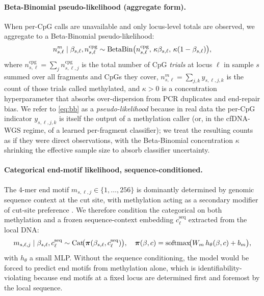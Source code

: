 \paragraph{Beta-Binomial pseudo-likelihood (aggregate form).} When per-CpG calls are unavailable and only locus-level totals are observed, we aggregate to a Beta-Binomial pseudo-likelihood:
\begin{equation}
n^m_{s,\ell}\mid \beta_{s,\ell}, n^{\mathrm{cpg}}_{s,\ell} \sim \mathrm{BetaBin}\big(n^{\mathrm{cpg}}_{s,\ell},\, \kappa\beta_{s,\ell},\,\kappa(1-\beta_{s,\ell})\big),
\label{eq:bb}
\end{equation}
where $n^{\mathrm{cpg}}_{s,\ell}=\sum_j n^{\mathrm{cpg}}_{s,\ell,j}$ is the total number of CpG \emph{trials} at locus $\ell$ in sample $s$ summed over all fragments and CpGs they cover, $n^m_{s,\ell}=\sum_{j,k}y_{s,\ell,j,k}$ is the count of those trials called methylated, and $\kappa>0$ is a concentration hyperparameter that absorbs over-dispersion from PCR duplicates and end-repair bias. We refer to \eqref{eq:bb} as a \emph{pseudo-likelihood} because in real data the per-CpG indicator $y_{s,\ell,j,k}$ is itself the output of a methylation caller (or, in the cfDNA-WGS regime, of a learned per-fragment classifier); we treat the resulting counts as if they were direct observations, with the Beta-Binomial concentration $\kappa$ shrinking the effective sample size to absorb classifier uncertainty.

\paragraph{Categorical end-motif likelihood, sequence-conditioned.} The 4-mer end motif $m_{s,\ell,j}\in\{1,\dots,256\}$ is dominantly determined by genomic sequence context at the cut site, with methylation acting as a secondary modifier of cut-site preference \citep{zhou2022}. We therefore condition the categorical on both methylation and a frozen sequence-context embedding $c^{\mathrm{seq}}_\ell$ extracted from the local DNA:
\begin{equation}
m_{s,\ell,j}\mid \beta_{s,\ell}, c^{\mathrm{seq}}_\ell \sim \mathrm{Cat}\!\big(\boldsymbol{\pi}(\beta_{s,\ell}, c^{\mathrm{seq}}_\ell)\big),\quad
\boldsymbol{\pi}(\beta, c) = \mathrm{softmax}\!\big(W_m\,h_\theta(\beta, c) + b_m\big),
\end{equation}
with $h_\theta$ a small MLP. Without the sequence conditioning, the model would be forced to predict end motifs from methylation alone, which is identifiability-violating because end motifs at a fixed locus are determined first and foremost by the local sequence.

